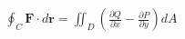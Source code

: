 \documentclass[preview]{standalone}
\begin{document}
\begin{align*}
\oint_C \mathbf{F} \cdot d\mathbf{r} = \iint_D \left( \frac{\partial Q}{\partial x} - \frac{\partial P}{\partial y} \right) dA
\end{align*}
\end{document}
